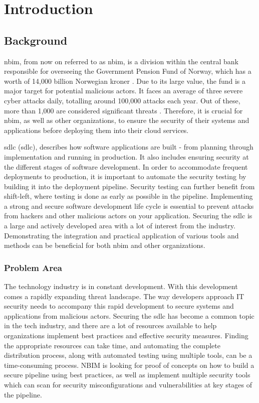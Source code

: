 \chapter{Introduction}

\section{Background} %
\acrlong{nbim}, from now on referred to as \acrshort{nbim}, is a division within the central bank responsible for overseeing the Government Pension Fund of Norway, which has a worth of 14,000 billion Norwegian kroner \cite{nbimwebsite}. Due to its large value, the fund is a major target for potential malicious actors. It faces an average of three severe cyber attacks daily, totalling around 100,000 attacks each year. Out of these, more than 1,000 are considered significant threats \cite{nbimattacks}. Therefore, it is crucial for \acrshort{nbim}, as well as other organizations, to ensure the security of their systems and applications before deploying them into their cloud services. 

\acrlong{sdlc} (\acrshort{sdlc}), describes how software applications are built - from planning through implementation and running in production. It also includes ensuring security at the different stages of software development. In order to accommodate frequent deployments to production, it is important to automate the security testing by building it into the deployment pipeline. Security testing can further benefit from shift-left, where testing is done as early as possible in the pipeline. Implementing a strong and secure software development life cycle is essential to prevent attacks from hackers and other malicious actors on your application. Securing the \acrshort{sdlc} is a large and actively developed area with a lot of interest from the industry. Demonstrating the integration and practical application of various tools and methods can be beneficial for both \acrshort{nbim} and other organizations.

\subsection{Problem Area}
The technology industry is in constant development. With this development comes a rapidly expanding threat landscape. The way developers approach IT security needs to accompany this rapid development to secure systems and applications from malicious actors. Securing the \acrlong{sdlc} has become a common topic in the tech industry, and there are a lot of resources available to help organizations implement best practices and effective security measures. Finding the appropriate resources can take time, and automating the complete distribution process, along with automated testing using multiple tools, can be a time-consuming process. NBIM is looking for proof of concepts on how to build a secure pipeline using best practices, as well as implement multiple security tools which can scan for security misconfigurations and vulnerabilities at key stages of the pipeline. 


